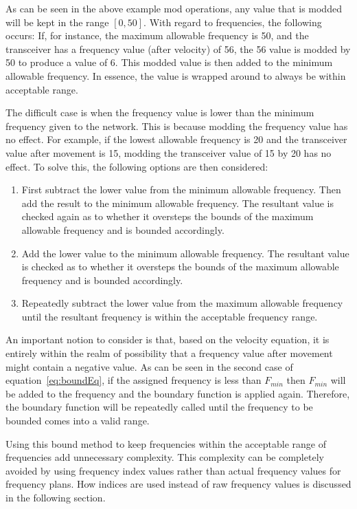 As can be seen in the above example mod operations, any value that is modded will be kept in the range $[0,50]$. With regard to frequencies, the following occurs: If, for instance, the maximum allowable frequency is 50, and the transceiver has a frequency value (after velocity) of 56, the 56 value is modded by 50 to produce a value of 6. This modded value is then added to the minimum allowable frequency. In essence, the value is wrapped around to always be within acceptable range. 

The difficult case is when the frequency value is lower than the minimum frequency given to the network. This is because modding the frequency value has no effect. For example, if the lowest allowable frequency is 20 and the transceiver value after movement is 15, modding the transceiver value of 15 by 20 has no effect. To solve this, the following options are then considered:

\begin{enumerate}
\item First subtract the lower value from the minimum allowable frequency. Then add the result to the minimum allowable frequency. The resultant value is checked again as to whether it oversteps the bounds of the maximum allowable frequency and is bounded accordingly.
\item Add the lower value to the minimum allowable frequency. The resultant value is checked as to whether it oversteps the bounds of the maximum allowable frequency and is bounded accordingly.
\item Repeatedly subtract the lower value from the maximum allowable frequency until the resultant frequency is within the acceptable frequency range.
\end{enumerate}

An important notion to consider is that, based on the velocity equation, it is entirely within the realm of possibility that a frequency value after movement might contain a negative value. As can be seen in the second case of equation~\ref{eq:boundEq}, if the assigned frequency is less than $F_{min}$ then $F_{min}$ will be added to the frequency and the boundary function is applied again. Therefore, the boundary function will be repeatedly called until the frequency to be bounded comes into a valid range.

Using this bound method to keep frequencies within the acceptable range of frequencies add unnecessary complexity. This complexity can be completely avoided by using frequency index values rather than actual frequency values for frequency plans. How indices are used instead of raw frequency values is discussed in the following section.
